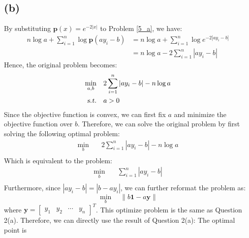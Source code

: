 \documentclass[10pt,a4paper]{article}
\begin{document}
\subsection*{(b)}
By substituting $\mathbf{p}(x) = e^{-2 |x|}$ to Problem \ref{5_a}, we have:
\begin{equation*}
	\begin{aligned}
		n \log{a} + \displaystyle\sum_{i = 1}^{n} \log{\mathbf{p}(a y_{i} - b)} &= n \log{a} + \displaystyle\sum_{i = 1}^{n} \log{e^{-2|ay_{i} - b|}} \\
		&= n \log{a} - 2 \displaystyle\sum_{i = 1}^{n}|ay_{i} - b|
	\end{aligned}
\end{equation*}
Hence, the original problem becomes:
\begin{equation*}
	\begin{aligned}
		\displaystyle\min_{a, b} \quad & 2 \displaystyle\sum_{i = 1}^{n}|ay_{i} - b| - n \log{a} \\
		\textsl{s.t.} \quad & a > 0
	\end{aligned}
\end{equation*}
Since the objective function is convex, we can first fix $a$ and minimize the objective function over $b$. Therefore, we can solve the original problem by first solving the following optimal problem:
\begin{equation*}
	\begin{aligned}
		\displaystyle\min_{b} \quad & 2 \displaystyle\sum_{i = 1}^{n}|ay_{i} - b| - n \log{a} \\
	\end{aligned}
\end{equation*}
Which is equivalent to the problem:
\begin{equation*}
	\begin{aligned}
		\displaystyle\min_{b} \quad & \displaystyle\sum_{i = 1}^{n}|ay_{i} - b| \\
	\end{aligned}
\end{equation*}
Furthermore, since $|ay_{i} - b| = |b - ay_{i}|$, we can further reformat the problem as:
\begin{equation*}
	\displaystyle\min_{b} \quad \| b \mathbf{1} - a \mathbf{y} \|
\end{equation*}
where $\mathbf{y} = \begin{bmatrix}
y_{1} & y_{2} & \cdots & y_{n}
\end{bmatrix}^{T}$. This optimize problem is  the same as Question 2(a). Therefore, we can directly use the result of Question 2(a): The optimal point is
\end{document}

